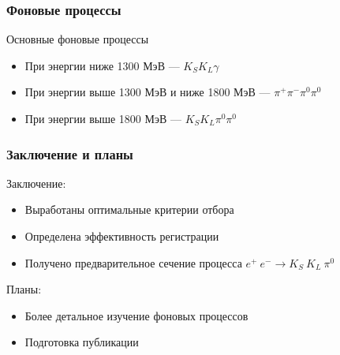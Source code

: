 \documentclass[14pt, hyperref = {colorlinks}]{beamer}
\begin{document}
\begin{frame}
\frametitle{Фоновые процессы}
Основные фоновые процессы
\begin{itemize}
    \item При энергии ниже 1300 МэВ --- $K_{S}K_{L}\gamma$
    \item При энергии выше 1300 МэВ и ниже 1800 МэВ --- $\pi^{+}\pi^{-}\pi^{0}\pi^{0}$
    \item При энергии выше 1800 МэВ --- $K_{S}K_{L}\pi^{0}\pi^{0}$
\end{itemize}
\end{frame}

\begin{frame}
\frametitle{Заключение и планы}
Заключение:
\begin{itemize}
    \item Выработаны оптимальные критерии отбора
    \item Определена эффективность регистрации
    \item Получено предварительное сечение процесса $e^{+}\:e^{-} \to K_{S}\:K_{L}\:\pi^{0}$
\end{itemize}
Планы:
\begin{itemize}
    \item Более детальное изучение фоновых процессов
    \item Подготовка публикации
\end{itemize}
\end{frame}
\end{document}
